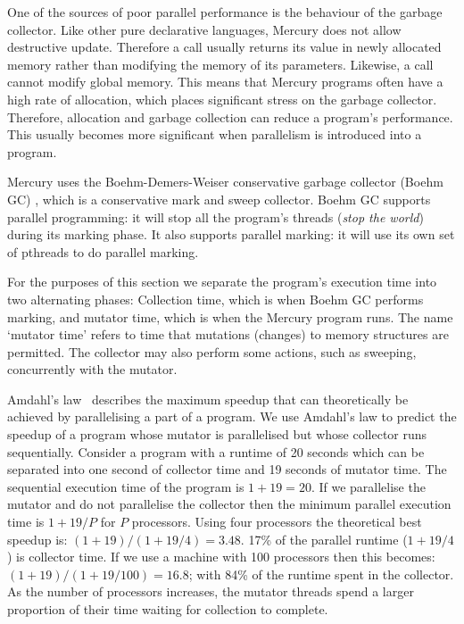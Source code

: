 

One of the sources of poor parallel performance is the behaviour of the
garbage collector.
Like other pure declarative languages,
Mercury does not allow destructive update.
Therefore a call usually returns its value in newly allocated memory
rather than modifying the memory of its parameters.
Likewise, a call cannot modify global memory.
This means that Mercury programs often have a high rate of allocation,
which places significant stress on the garbage collector.
Therefore,
allocation and garbage collection can reduce a program's
performance.
This usually becomes more significant when parallelism is introduced into a
program.

Mercury uses the Boehm-Demers-Weiser conservative garbage collector (Boehm GC)
\citep{boehm_gc},
which is a conservative mark and sweep collector.
Boehm GC supports parallel programming:
it will stop all the program's threads (\emph{stop the world}) during its
marking phase.
It also supports parallel marking:
it will use its own set of pthreads to do parallel marking.

For the purposes of this section
we separate the program's execution time into two alternating phases:
Collection time, which is when Boehm GC performs marking,
and mutator time, which is when the Mercury program runs.
The name `mutator time' refers to time that mutations (changes) to memory
structures are permitted.
The collector may also perform some actions,
such as sweeping,
concurrently with the mutator.

Amdahl's law~\citep{amdahl} describes the maximum speedup that
can theoretically be achieved by parallelising a part of a program.
We use Amdahl's law to predict the speedup of a program whose
mutator is parallelised but whose collector runs sequentially.
Consider a program with a runtime of 20 seconds
which can be separated into one second of collector time and 19 seconds
of mutator time.
The sequential execution time of the program is $1 + 19 = 20$.
If we parallelise the mutator and do not parallelise the
collector then the minimum parallel execution time is $1 + 19/P$
for $P$ processors.
Using four processors the theoretical best speedup is:
$(1 + 19) / (1 + 19/4) = 3.48$.
17\% of the parallel runtime ($1 + 19/4$) is collector time.
If we use a machine with 100 processors then this becomes:
$(1 + 19) / (1 + 19/100) = 16.8$;
with 84\% of the runtime spent in the collector.
As the number of processors increases,
the mutator threads spend a larger proportion of their time waiting for
collection to complete.

